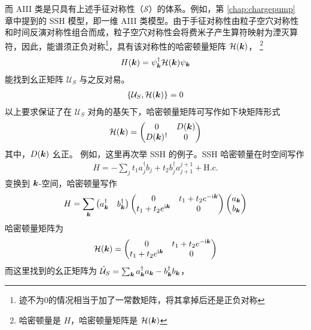 而 AIII 类是只具有上述手征对称性（$\mathcal{S}$）的体系。例如，第 \ref{chap:chargepump} 章中提到的 SSH 模型，即一维 AIII 类模型。由于手征对称性由粒子空穴对称性和时间反演对称性组合而成，粒子空穴对称性会将费米子产生算符映射为湮灭算符，因此，能谱须正负对称\footnote{迹不为0的情况相当于加了一常数矩阵，将其拿掉后还是正负对称}，具有该对称性的哈密顿量矩阵 $\mathcal{H}(\boldsymbol{k})$，
\footnote{哈密顿量是 $H$，哈密顿量矩阵是 $\mathcal{H}(\boldsymbol{k})$}
\begin{align}
H(\boldsymbol{k}) = \psi_{\boldsymbol{k}}^{\dag}\mathcal{H}(\boldsymbol{k})\psi_{\boldsymbol{k}}
\end{align}
能找到幺正矩阵 $\mathcal{U}_S$ 与之反对易。
\begin{align}
\{\mathcal{U}_S, \mathcal{H}(\boldsymbol{k})\} = 0
\end{align}
以上要求保证了在 $\mathcal{U}_S$ 对角的基矢下，哈密顿量矩阵可写作如下块矩阵形式
\begin{align}
\mathcal{H}(\boldsymbol{k}) = \begin{pmatrix}
0 & D(\boldsymbol{k}) \\
D(\boldsymbol{k})^{\dagger} & 0
\end{pmatrix}
\end{align}
其中，$D(\boldsymbol{k})$ 幺正。
例如，这里再次举 SSH 的例子。SSH 哈密顿量在时空间写作
\begin{align}
H = -\sum_jt_1a^{\dagger}_{j}b_{j} + t_2 b^{\dagger}_ja^{j+1}_{j+1} + \text{H.c.}
\end{align}
变换到 $\boldsymbol{k}$-空间，哈密顿量写作
\begin{align}
H = \sum_{\boldsymbol{k}}
\begin{pmatrix}
a_{\boldsymbol{k}}^{\dag} & b_{\boldsymbol{k}}^{\dag}
\end{pmatrix}
\begin{pmatrix}
0 & t_1 + t_2e^{-\mathrm{i}\boldsymbol{k}} \\
t_1 + t_2e^{\mathrm{i}\boldsymbol{k}} & 0
\end{pmatrix}
\begin{pmatrix}
a_{\boldsymbol{k}} \\ b_{\boldsymbol{k}}
\end{pmatrix}
\end{align}
哈密顿量矩阵为
\begin{align}
\mathcal{H}(\boldsymbol{k}) = 
\begin{pmatrix}
0 & t_1 + t_2e^{-\mathrm{i}\boldsymbol{k}} \\
t_1 + t_2e^{\mathrm{i}\boldsymbol{k}} & 0
\end{pmatrix}
\end{align}
而这里找到的幺正矩阵为 $\hat{\mathcal{U}}_S = \sum_{\boldsymbol{k}} a^{\dag}_{\boldsymbol{k}}a_{\boldsymbol{k}} - b^{\dag}_{\boldsymbol{k}}b_{\boldsymbol{k}} $，
